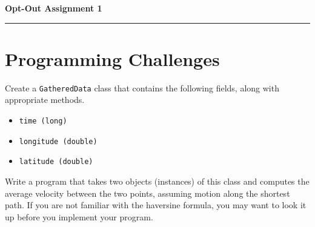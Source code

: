 \documentclass[letterpaper,11pt]{article}
\begin{document}
\begin{center}
{\bfseries \LARGE Opt-Out Assignment 1}
\end{center}

\noindent
\rule[1mm]{\linewidth}{0.2pt}

\section*{Programming Challenges}

Create a \texttt{GatheredData} class that contains the following fields, along with appropriate methods.
\begin{itemize}
\item \texttt{time (long)}
\item \texttt{longitude (double)}
\item \texttt{latitude (double)}
\end{itemize}
Write a program that takes two objects (instances) of this class and computes the average velocity between the two points, assuming motion along the shortest path.
If you are not familiar with the haversine formula, you may want to look it up before you implement your program.
\end{document}
